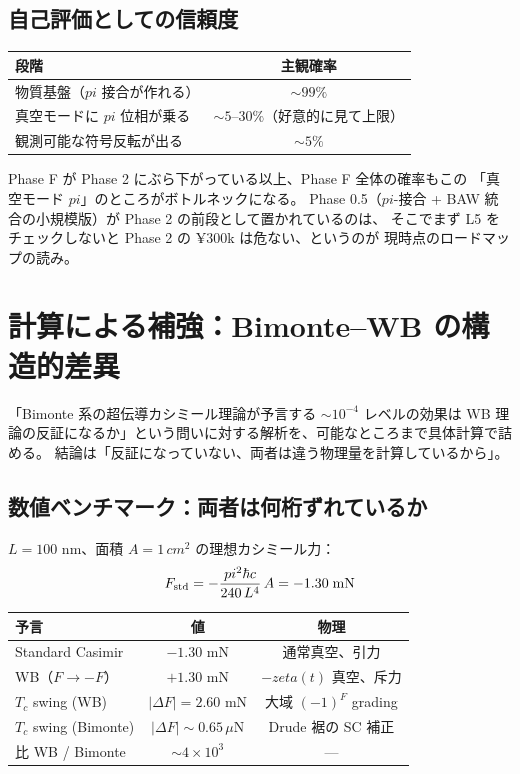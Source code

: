 \documentclass[11pt,a4paper]{article}
\def\pi{pi}%
\def\zeta{zeta}%
\def\mathrm#1{#1}%
\def\textbf#1{#1}%
\begin{document}
\subsection{自己評価としての信頼度}

\begin{center}
\begin{tabular}{lc}
\toprule
段階 & 主観確率 \\
\midrule
物質基盤（$\pi$ 接合が作れる） & $\sim 99\%$ \\
真空モードに $\pi$ 位相が乗る & $\sim 5\text{--}30\%$（好意的に見て上限） \\
観測可能な符号反転が出る & $\sim 5\%$ \\
\bottomrule
\end{tabular}
\end{center}

Phase F が Phase 2 にぶら下がっている以上、Phase F 全体の確率もこの
「真空モード $\pi$」のところがボトルネックになる。
Phase 0.5（$\pi$-接合 + BAW 統合の小規模版）が Phase 2 の前段として置かれているのは、
そこでまず L5 をチェックしないと Phase 2 の ¥300k は危ない、というのが
現時点のロードマップの読み。

\section{計算による補強：Bimonte--WB の構造的差異}

「Bimonte 系の超伝導カシミール理論が予言する $\sim 10^{-4}$ レベルの効果は
WB 理論の反証になるか」という問いに対する解析を、可能なところまで具体計算で詰める。
結論は「\textbf{反証になっていない、両者は違う物理量を計算しているから}」。

\subsection{数値ベンチマーク：両者は何桁ずれているか}

$L = 100$ nm、面積 $A = 1\,\mathrm{cm}^2$ の理想カシミール力：
\[
  F_{\rm std} = -\frac{\pi^2\hbar c}{240\,L^4}\,A = -1.30\;\text{mN}
\]

\begin{center}
\begin{tabular}{lcc}
\toprule
予言 & 値 & 物理 \\
\midrule
Standard Casimir & $-1.30$ mN & 通常真空、引力 \\
WB（$F\to -F$）  & $+1.30$ mN & $-\zeta(t)$ 真空、斥力 \\
\midrule
$T_c$ swing (WB)      & $|\Delta F| = 2.60$ mN          & 大域 $(-1)^F$ grading \\
$T_c$ swing (Bimonte) & $|\Delta F| \sim 0.65\,\mu$N    & Drude 裾の SC 補正 \\
\midrule
比 WB / Bimonte & $\sim 4\times 10^{3}$ & --- \\
\bottomrule
\end{tabular}
\end{center}
\end{document}
